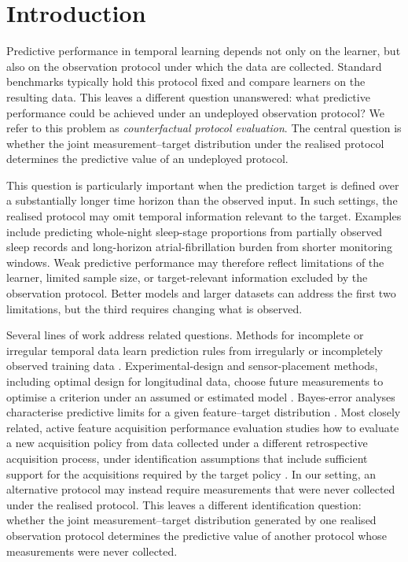 \section{Introduction}
\label{sec:introduction}


Predictive performance in temporal learning depends not only on the learner, but also on the observation protocol under which the data are collected. Standard benchmarks typically hold this protocol fixed and compare learners on the resulting data. This leaves a different question unanswered: what predictive performance could be achieved under an undeployed observation protocol? We refer to this problem as \emph{counterfactual protocol evaluation}. The central question is whether the joint measurement–target distribution under the realised protocol determines the predictive value of an undeployed protocol.


This question is particularly important when the prediction target is defined over a substantially longer time horizon than the observed input. In such settings, the realised protocol may omit temporal information relevant to the target. Examples include predicting whole-night sleep-stage proportions from partially observed sleep records and long-horizon atrial-fibrillation burden from shorter monitoring windows. Weak predictive performance may therefore reflect limitations of the learner, limited sample size, or target-relevant information excluded by the observation protocol. Better models and larger datasets can address the first two limitations, but the third requires changing what is observed.




Several lines of work address related questions. Methods for incomplete or irregular temporal data learn prediction rules from irregularly or incompletely observed training data \citep{che2018grud,rubanova2019latent,kidger2020neural}. Experimental-design and sensor-placement methods, including optimal design for longitudinal data, choose future measurements to optimise a criterion under an assumed or estimated model \citep{chaloner1995bayesian,krause2008near,ji2017optimal}. Bayes-error analyses characterise predictive limits for a given feature--target distribution \citep{fukunaga1987bayes,ishida2023performance}. Most closely related, active feature acquisition performance evaluation studies how to evaluate a new acquisition policy from data collected under a different retrospective acquisition process, under identification assumptions that include sufficient support for the acquisitions required by the target policy \citep{vonkleist2025evaluation,precup2000eligibility,kallus2020double}. In our setting, an alternative protocol may instead require measurements that were never collected under the realised protocol. This leaves a different identification question: whether the joint measurement--target distribution generated by one realised observation protocol determines the predictive value of another protocol whose measurements were never collected.


